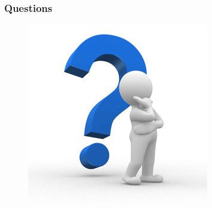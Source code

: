 \documentclass[compress]{beamer}
\begin{document}
\begin{frame}
\frametitle{Questions}
\begin{figure}[h!tb]
\includegraphics[height=0.7\textheight]{../resources/question.jpg}
\end{figure}
\end{frame}
\end{document}

